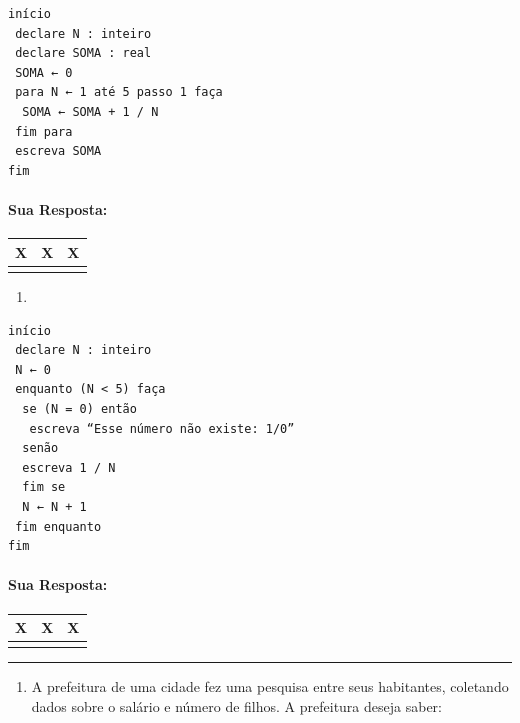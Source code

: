 \documentclass[12pt,a4paper]{article}
\providecommand{\tightlist}{%
      \setlength{\itemsep}{0pt}\setlength{\parskip}{0pt}}
\begin{document}
\begin{verbatim}
início
 declare N : inteiro
 declare SOMA : real
 SOMA ← 0
 para N ← 1 até 5 passo 1 faça
  SOMA ← SOMA + 1 / N
 fim para
 escreva SOMA
fim 
\end{verbatim}

    \hypertarget{sua-resposta}{%
\paragraph{Sua Resposta:}\label{sua-resposta}}

\begin{longtable}[]{@{}ccc@{}}
\toprule()
X & X & X \\
\midrule()
\endhead
& & \\
\bottomrule()
\end{longtable}

    \begin{enumerate}
\def\labelenumi{\alph{enumi})}
\setcounter{enumi}{7}
\tightlist
\item
\end{enumerate}

\begin{verbatim}
início
 declare N : inteiro
 N ← 0
 enquanto (N < 5) faça
  se (N = 0) então
   escreva “Esse número não existe: 1/0”
  senão
  escreva 1 / N
  fim se
  N ← N + 1
 fim enquanto
fim 
\end{verbatim}

    \hypertarget{sua-resposta}{%
\paragraph{Sua Resposta:}\label{sua-resposta}}

\begin{longtable}[]{@{}ccc@{}}
\toprule()
X & X & X \\
\midrule()
\endhead
& & \\
\bottomrule()
\end{longtable}

    \begin{center}\rule{0.5\linewidth}{0.5pt}\end{center}

\begin{enumerate}
\def\labelenumi{\arabic{enumi}.}
\setcounter{enumi}{4}
\tightlist
\item
  A prefeitura de uma cidade fez uma pesquisa entre seus habitantes,
  coletando dados sobre o salário e número de filhos. A prefeitura
  deseja saber:
\end{enumerate}
\end{document}
